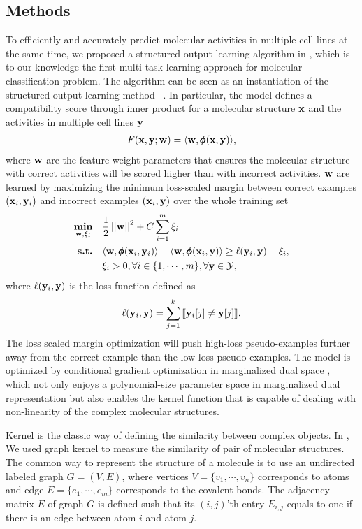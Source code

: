 {\subsection{Methods}

To efficiently and accurately predict molecular activities in multiple cell lines at the same time, we proposed a structured output learning algorithm in , which is to our knowledge the first multi-task learning approach for molecular classification problem.
The algorithm can be seen as an instantiation of the structured output learning method \mmcrf\ \citep{rousu06}.
In particular, the model defines a compatibility score through inner product for a molecular structure $\mathbf {x}$ and the activities in multiple cell lines $\mathbf {y}$
\begin{align*}
	F(\mathbf {x},\mathbf {y};\mathbf {w}) = \langle \mathbf {w}, \pmb \phi(\mathbf {x},\mathbf {y}) \rangle,
\end{align*}
where $\mathbf {w}$ are the feature weight parameters that ensures the molecular structure with correct activities will be scored higher than with incorrect activities.
$\mathbf {w}$ are learned by maximizing the minimum loss-scaled margin between correct examples $(\mathbf {x}_i,\mathbf {y}_i)$ and incorrect examples $(\mathbf {x}_i,\mathbf {y})$ over the whole training set
\begin{align*}
	\underset{\mathbf {w},\mathbf{\xi}_i}{\textbf{min}} & \quad \frac{1}{2}\left|\left| \mathbf {w} \right|\right|^2 + C\sum_{i=1}^{m}\xi_i\\
	\textbf{s.t.} &\quad \langle \mathbf {w}, \pmb \phi(\mathbf {x}_i,\mathbf {y}_i) \rangle - \langle \mathbf {w}, \pmb \phi(\mathbf {x}_i,\mathbf {y}) \rangle \ge \ell(\mathbf {y}_i,\mathbf {y})-\xi_i,\\
	&\quad \xi_i>0, \forall i\in\{1,\cdots,m\}, \forall \mathbf {y}\in\mathcal{Y},
\end{align*}
where $\ell(\mathbf {y}_i,\mathbf {y})$ is the loss function defined as
\begin{align*}
	\ell(\mathbf {y}_i,\mathbf {y}) = \sum_{j=1}^{k}{\llbracket \mathbf {y}_i[j]\neq \mathbf {y}[j] \rrbracket}.
\end{align*}
The loss scaled margin optimization will push high-loss pseudo-examples further away from the correct example than the low-loss pseudo-examples.
The model is optimized by conditional gradient optimization \citep{Bertsekas95nonlinear} in marginalized dual space \citep{Taskar04max}, which not only enjoys a polynomial-size parameter space in marginalized dual representation but also enables the kernel function that is capable of dealing with non-linearity of the complex molecular structures.

Kernel is the classic way of defining the similarity between complex objects.
In , We used graph kernel to measure the similarity of pair of molecular structures.
The common way to represent the structure of a molecule is to use an undirected labeled graph $G=(V,E)$, where vertices $V=\{v_1,\cdots,v_n\}$ corresponds to atoms and edge $E=\{e_1,\cdots,e_m\}$ corresponds to the covalent bonds.
The adjacency matrix $E$ of graph $G$ is defined sush that its $(i,j)$'th entry $E_{i,j}$ equals to one if there is an edge between atom $i$ and atom $j$.

}
